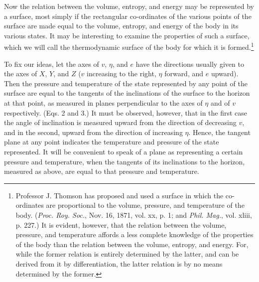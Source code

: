 \documentclass[11pt]{article}
\begin{document}
Now the relation between the volume, entropy, and energy may be represented by a surface, most simply if the rectangular co-ordinates of the various points of the surface are made equal to the volume, entropy, and energy of the body in its various states. It may be interesting to examine the properties of such a surface, which we will call the thermodynamic surface of the body for which it is formed.\footnote{Professor J. Thomson has proposed and used a surface in which the co-ordinates are proportional to the volume, pressure, and temperature of the body. (\emph{Proc. Roy. Soc.}, Nov. 16, 1871, vol. xx, p. 1; and \emph{Phil. Mag.}, vol. xliii, p. 227.) It is evident, however, that the relation between the volume, pressure, and temperature affords a less complete knowledge of the properties of the body than the relation between the volume, entropy, and energy. For, while the former relation is entirely determined by the latter, and can be derived from it by differentiation, the latter relation is by no means determined by the former.}

To fix our ideas, let the axes of $v$, $\eta$, and $e$ have the directions usually given to the axes of $X$, $Y$, and $Z$ ($v$ increasing to the right, $\eta$ forward, and $e$ upward). Then the pressure and temperature of the state represented by any point of the surface are equal to the tangents of the inclinations of the surface to the horizon at that point, as measured in planes perpendicular to the axes of $\eta$ and of $v$ respectively. (Eqs. 2 and 3.) It must be observed, however, that in the first case the angle of inclination is measured upward from the direction of decreasing $v$, and in the second, upward from the direction of increasing $\eta$. Hence, the tangent plane at any point indicates the temperature and pressure of the state represented. It will be convenient to speak of a plane as representing a certain pressure and temperature, when the tangents of its inclinations to the horizon, measured as above, are equal to that pressure and temperature.
\end{document}
